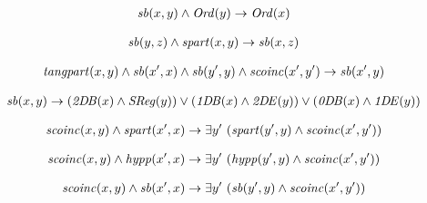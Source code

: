 \begin{erin}
    \begin{align*}
        \mathit{sb}(x,y) \wedge \mathit{Ord}(y) \to \mathit{Ord}(x)
    \end{align*}
\end{erin}

\begin{erin}
    \begin{align*}
        \mathit{sb}(y,z) \wedge \mathit{spart}(x,y) \to \mathit{sb}(x,z)
    \end{align*}
\end{erin}

\begin{erin}
    \begin{align*}
        \mathit{tangpart}(x,y) \wedge \mathit{sb}(x',x) \wedge \mathit{sb}(y',y) \wedge \mathit{scoinc}(x',y') \to \mathit{sb}(x',y)
    \end{align*}
\end{erin}
                
\begin{erin}
    \begin{align*}
        \mathit{sb}(x,y) \to (\mathit{2D\hspace*{-0.25ex} B}(x) \wedge \mathit{S\hspace*{-0.25ex}Reg}(y)) \vee (\mathit{1D\hspace*{-0.25ex} B}(x) \wedge \mathit{2D\hspace*{-0.25ex} E}(y)) \vee (\mathit{0D\hspace*{-0.25ex} B}(x) \wedge \mathit{1D\hspace*{-0.25ex} E}(y))
    \end{align*}
\end{erin}

\begin{erin}
    \begin{align*}
        \Gscoinc(x,y) \wedge \Gspart(x',x) \to \exists y' \ (\Gspart(y',y) \wedge \Gscoinc(x',y'))
    \end{align*}
\end{erin}

\begin{erin}
    \begin{align*}
        \mathit{scoinc}(x,y) \wedge \mathit{hypp}(x',x) \to \exists y' \ (\mathit{hypp}(y',y) \wedge \mathit{scoinc}(x',y'))
    \end{align*}
\end{erin}

\begin{erin}
    \begin{align*}
        \mathit{scoinc}(x,y) \wedge \mathit{sb}(x',x) \to \exists y' \ (\mathit{sb}(y',y) \wedge \mathit{scoinc}(x',y'))
    \end{align*}
\end{erin}

